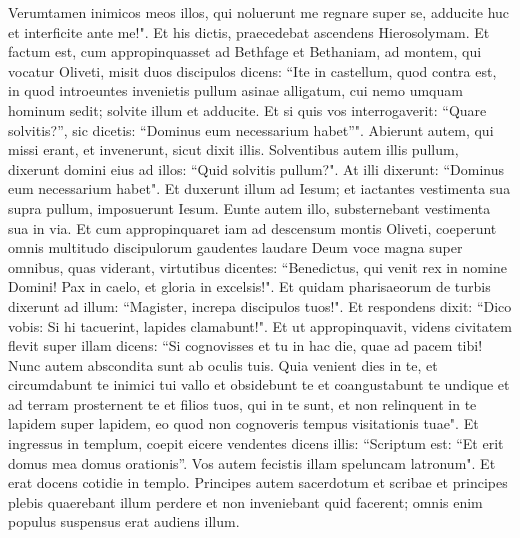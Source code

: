 \begin{biblechapter}
\verse Verumtamen inimicos meos illos, qui noluerunt me regnare super se, adducite huc et interficite ante me!". 
\verse Et his dictis, praecedebat ascendens Hierosolymam. 
\verse Et factum est, cum appropinquasset ad Bethfage et Bethaniam, ad montem, qui vocatur Oliveti, misit duos discipulos 
\verse dicens: “Ite in castellum, quod contra est, in quod introeuntes invenietis pullum asinae alligatum, cui nemo umquam hominum sedit; solvite illum et adducite. 
\verse Et si quis vos interrogaverit: “Quare solvitis?”, sic dicetis: “Dominus eum necessarium habet”". 
\verse Abierunt autem, qui missi erant, et invenerunt, sicut dixit illis.  
\verse Solventibus autem illis pullum, dixerunt domini eius ad illos: “Quid solvitis pullum?". 
\verse At illi dixerunt: “Dominus eum necessarium habet".  
\verse Et duxerunt illum ad Iesum; et iactantes vestimenta sua supra pullum, imposuerunt Iesum. 
\verse Eunte autem illo, substernebant vestimenta sua in via.  
\verse Et cum appropinquaret iam ad descensum montis Oliveti, coeperunt omnis multitudo discipulorum gaudentes laudare Deum voce magna super omnibus, quas viderant, virtutibus 
\verse dicentes: “Benedictus, qui venit rex in nomine Domini! Pax in caelo, et gloria in excelsis!". 
\verse Et quidam pharisaeorum de turbis dixerunt ad illum: “Magister, increpa discipulos tuos!". 
\verse Et respondens dixit: “Dico vobis: Si hi tacuerint, lapides clamabunt!". 
\verse Et ut appropinquavit, videns civitatem flevit super illam 
\verse dicens: “Si cognovisses et tu in hac die, quae ad pacem tibi! Nunc autem abscondita sunt ab oculis tuis. 
\verse Quia venient dies in te, et circumdabunt te inimici tui vallo et obsidebunt te et coangustabunt te undique 
\verse et ad terram prosternent te et filios tuos, qui in te sunt, et non relinquent in te lapidem super lapidem, eo quod non cognoveris tempus visitationis tuae". 
\verse Et ingressus in templum, coepit eicere vendentes 
\verse dicens illis: “Scriptum est: “Et erit domus mea domus orationis”. Vos autem fecistis illam speluncam latronum". 
\verse Et erat docens cotidie in templo. Principes autem sacerdotum et scribae et principes plebis quaerebant illum perdere 
\verse et non inveniebant quid facerent; omnis enim populus suspensus erat audiens illum. 
\end{biblechapter}

